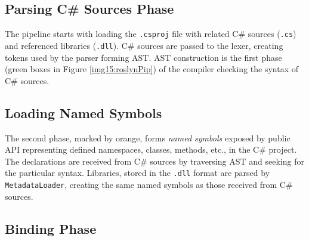 \subsection{Parsing C\# Sources Phase}

The pipeline starts with loading the \texttt{.csproj} file with related C\# sources (\texttt{.cs}) and referenced libraries (\texttt{.dll}).
C\# sources are passed to the lexer, creating tokens used by the parser forming \ac{AST}.
\ac{AST} construction is the first phase (green boxes in Figure \ref{img15:roslynPip}) of the compiler checking the syntax of C\# sources.

\subsection{Loading Named Symbols}

The second phase, marked by orange, forms \emph{named symbols} exposed by public API representing defined namespaces, classes, methods, etc., in the C\# project. 
The declarations are received from C\# sources by traversing \ac{AST} and seeking for the particular syntax. 
Libraries, stored in the \texttt{.dll} format are parsed by \texttt{MetadataLoader}, creating the same named symbols as those received from C\# sources.

\subsection{Binding Phase}


